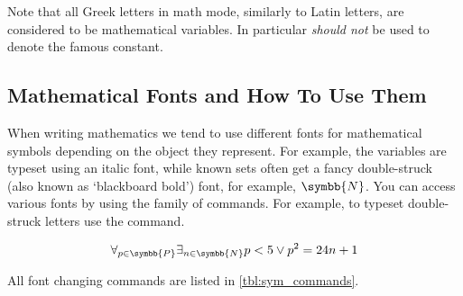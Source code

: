 Note that all Greek letters in math mode, similarly to Latin letters,
are considered to be mathematical variables. In particular 
\emph{should not} be used to denote the famous constant.

\subsection{Mathematical Fonts and How To Use Them}

When writing mathematics we tend to use different fonts for
mathematical symbols depending on the object they represent. For example, the
variables are typeset using an italic font, while known sets often get a fancy
double-struck (also known as \enquote*{blackboard bold}) font, for example,
\(\symbb{N}\). You can access various fonts by using the family of 
commands. For example, to typeset double-struck letters use the 
command.
\begin{example}
\[
  \forall_{p \in \symbb{P}}
  \exists_{n \in \symbb{N}}
  p < 5 \lor p^2 = 24n + 1
\]
\end{example}
All font changing commands are listed in \autoref{tbl:sym_commands}.
